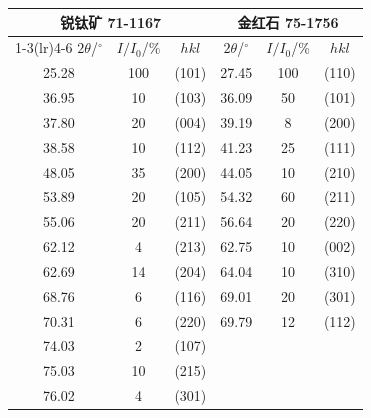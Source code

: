 \begin{tabular}{@{}cccccc@{}}
\toprule
\multicolumn{3}{c}{锐钛矿 71-1167} & \multicolumn{3}{c}{金红石 75-1756} \\
\cmidrule(lr){1-3}\cmidrule(lr){4-6}
$2\theta$/$^\circ$ & $I/I_0$/\% & $hkl$ & $2\theta$/$^\circ$ & $I/I_0$/\% & $hkl$ \\
\midrule
25.28 & 100 & (101) & 27.45 & 100 & (110) \\
36.95 & 10 & (103) & 36.09 & 50 & (101) \\
37.80 & 20 & (004) & 39.19 & 8 & (200) \\
38.58 & 10 & (112) & 41.23 & 25 & (111) \\
48.05 & 35 & (200) & 44.05 & 10 & (210) \\
53.89 & 20 & (105) & 54.32 & 60 & (211) \\
55.06 & 20 & (211) & 56.64 & 20 & (220) \\
62.12 & 4 & (213) & 62.75 & 10 & (002) \\
62.69 & 14 & (204) & 64.04 & 10 & (310) \\
68.76 & 6 & (116) & 69.01 & 20 & (301) \\
70.31 & 6 & (220) & 69.79 & 12 & (112) \\
74.03 & 2 & (107) &  &  &  \\
75.03 & 10 & (215) &  &  &  \\
76.02 & 4 & (301) &  &  &  \\
\bottomrule
\end{tabular}
